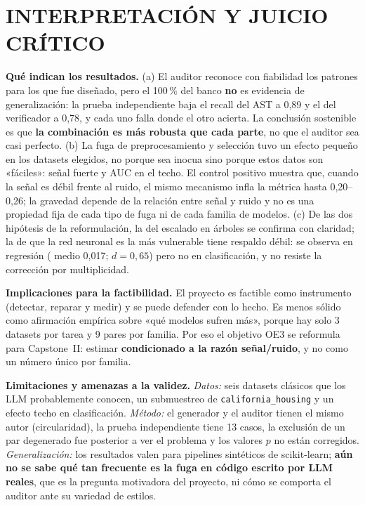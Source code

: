 
\chapter{INTERPRETACIÓN Y JUICIO CRÍTICO}
\label{ch:interpretacion}

\textbf{Qué indican los resultados.} (a) El auditor reconoce con fiabilidad los patrones para los que fue diseñado, pero el 100\,\% del banco \textbf{no} es evidencia de generalización: la prueba independiente baja el recall del AST a 0,89 y el del verificador a 0,78, y cada uno falla donde el otro acierta. La conclusión sostenible es que \textbf{la combinación es más robusta que cada parte}, no que el auditor sea casi perfecto. (b) La fuga de preprocesamiento y selección tuvo un efecto pequeño en los datasets elegidos, no porque sea inocua sino porque estos datos son «fáciles»: señal fuerte y AUC en el techo. El control positivo muestra que, cuando la señal es débil frente al ruido, el mismo mecanismo infla la métrica hasta 0,20--0,26; la gravedad depende de la relación entre señal y ruido y no es una propiedad fija de cada tipo de fuga ni de cada familia de modelos. (c) De las dos hipótesis de la reformulación, la del escalado en árboles se confirma con claridad; la de que la red neuronal es la más vulnerable tiene respaldo débil: se observa en regresión (\DOpt{} medio 0,017; $d=0{,}65$) pero no en clasificación, y no resiste la corrección por multiplicidad.

\textbf{Implicaciones para la factibilidad.} El proyecto es factible como instrumento (detectar, reparar y medir) y se puede defender con lo hecho. Es menos sólido como afirmación empírica sobre «qué modelos sufren más», porque hay solo 3 datasets por tarea y 9 pares por familia. Por eso el objetivo OE3 se reformula para Capstone~II: estimar \DOpt{} \textbf{condicionado a la razón señal/ruido}, y no como un número único por familia.

\textbf{Limitaciones y amenazas a la validez.} \emph{Datos:} seis datasets clásicos que los LLM probablemente conocen, un submuestreo de \texttt{california\_housing} y un efecto techo en clasificación. \emph{Método:} el generador y el auditor tienen el mismo autor (circularidad), la prueba independiente tiene 13 casos, la exclusión de un par degenerado fue posterior a ver el problema y los valores $p$ no están corregidos. \emph{Generalización:} los resultados valen para pipelines sintéticos de scikit-learn; \textbf{aún no se sabe qué tan frecuente es la fuga en código escrito por LLM reales}, que es la pregunta motivadora del proyecto, ni cómo se comporta el auditor ante su variedad de estilos.

